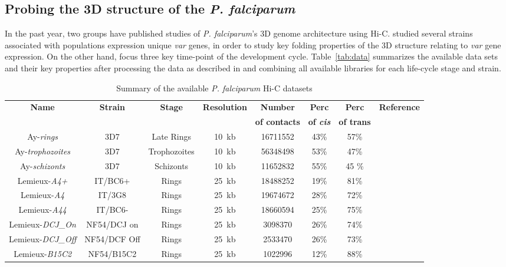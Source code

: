 \documentclass[letterpaper,12pt]{article}
\begin{document}
\subsection{Probing the 3D structure of the {\em P. falciparum}}
In the past year, two groups have published studies of {\em P.
falciparum}'s 3D genome architecture using Hi-C. \citet{lemieux:genome-wide}
studied several strains associated with populations expression unique
\textit{var} genes, in order to study key folding properties of the 3D
structure relating to \textit{var} gene expression. On the other hand,
\citet{ay:three-dimensional} focus three key time-point of the development
cycle. Table~\ref{tab:data} summarizes the available data sets and their key
properties after processing the data as described in
\citet{ay:three-dimensional} and combining all available libraries for each
life-cycle stage and strain.



\begin{table}
\scriptsize
\centering
\begin{tabular}{cccccccc}
\hline
\multirow{2}{*}{\textbf{Name}} & \multirow{2}{*}{\textbf{Strain}} &
\multirow{2}{*}{\textbf{Stage}} & \multirow{2}{*}{\textbf{Resolution}} &
\textbf{Number} & \textbf{Perc} & \textbf{Perc}& \multirow{2}{*}{\textbf{Reference}} \\
& & & & \textbf{of contacts} & \textbf{of \textit{cis}}& \textbf{of trans}& \\
\hline
\hline
Ay-\textit{rings} & 3D7 & Late Rings & 10~kb & 16711552 & 43\% & 57\% &  \cite{ay:three-dimensional} \\
Ay-\textit{trophozoites} & 3D7 & Trophozoites &10~kb & 56348498 & 53\% & 47\% & \cite{ay:three-dimensional} \\
Ay-\textit{schizonts} & 3D7 & Schizonts & 10~kb & 11652832 & 55\% & 45 \% & \cite{ay:three-dimensional} \\
Lemieux-\textit{A4+} & IT/BC6+ & Rings & 25~kb & 18488252 & 19\% & 81\% & \cite{lemieux:genome-wide} \\
Lemieux-\textit{A4} & IT/3G8 & Rings &  25~kb & 19674672 & 28\% & 72\% & \cite{lemieux:genome-wide}\\
Lemieux-\textit{A44} & IT/BC6- & Rings & 25~kb & 18660594 & 25\% & 75\% & \cite{lemieux:genome-wide}\\
Lemieux-\textit{DCJ\_On} & NF54/DCJ on & Rings & 25~kb & 3098370 & 26\% & 74\% &\cite{lemieux:genome-wide} \\
Lemieux-\textit{DCJ\_Off} & NF54/DCF Off & Rings & 25~kb & 2533470 & 26\% & 73\% &\cite{lemieux:genome-wide} \\
Lemieux-\textit{B15C2} & NF54/B15C2 & Rings & 25~kb &  1022996 & 12\% & 88\% & \cite{lemieux:genome-wide}\\
\hline
\end{tabular}
\caption{Summary of the available {\em P. falciparum} Hi-C datasets}
\end{table}
\end{document}
